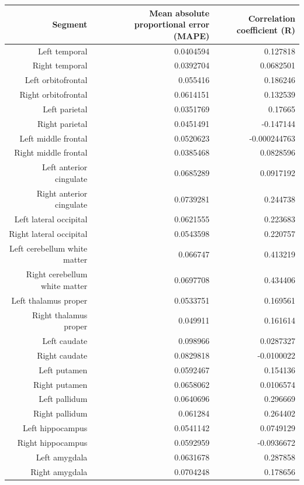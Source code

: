 \documentclass{article}
\begin{document}
  \begin{table}
    \begin{tabular}{|r|r|r|}
      \hline\hline
      \textbf{Segment} & \textbf{Mean absolute proportional error (MAPE)} & \textbf{Correlation coefficient (R)} \\\hline
      Left temporal & 0.0404594 & 0.127818 \\
      Right temporal & 0.0392704 & 0.0682501 \\
      Left orbitofrontal & 0.055416 & 0.186246 \\
      Right orbitofrontal & 0.0614151 & 0.132539 \\
      Left parietal & 0.0351769 & 0.17665 \\
      Right parietal & 0.0451491 & -0.147144 \\
      Left middle frontal & 0.0520623 & -0.000244763 \\
      Right middle frontal & 0.0385468 & 0.0828596 \\
      Left anterior cingulate & 0.0685289 & 0.0917192 \\
      Right anterior cingulate & 0.0739281 & 0.244738 \\
      Left lateral occipital & 0.0621555 & 0.223683 \\
      Right lateral occipital & 0.0543598 & 0.220757 \\
      Left cerebellum white matter & 0.066747 & 0.413219 \\
      Right cerebellum white matter & 0.0697708 & 0.434406 \\
      Left thalamus proper & 0.0533751 & 0.169561 \\
      Right thalamus proper & 0.049911 & 0.161614 \\
      Left caudate & 0.098966 & 0.0287327 \\
      Right caudate & 0.0829818 & -0.0100022 \\
      Left putamen & 0.0592467 & 0.154136 \\
      Right putamen & 0.0658062 & 0.0106574 \\
      Left pallidum & 0.0640696 & 0.296669 \\
      Right pallidum & 0.061284 & 0.264402 \\
      Left hippocampus & 0.0541142 & 0.0749129 \\
      Right hippocampus & 0.0592959 & -0.0936672 \\
      Left amygdala & 0.0631678 & 0.287858 \\
      Right amygdala & 0.0704248 & 0.178656 \\

\end{tabular}
\end{table}
\end{document}
